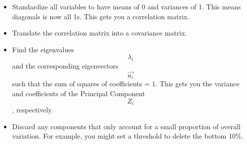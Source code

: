 \begin{itemize}
\tightlist
\item
  Standardize all variables to have means of 0 and variances of 1. This
  means diagonals is now all 1s. This gets you a correlation matrix.
\item
  Translate the correlation matrix into a covariance matrix.
\item
  Find the eigenvalues \[\lambda_i\] and the corresponding eigenvectors
  \[\vec{a_i}\] such that the sum of squares of coefficients = 1. This
  gets you the variance and coefficients of the Principal Component
  \[Z_i\], respectively.
\item
  Discard any components that only account for a small proportion of
  overall variation. For example, you might set a threshold to delete
  the bottom 10\%.
\end{itemize}
